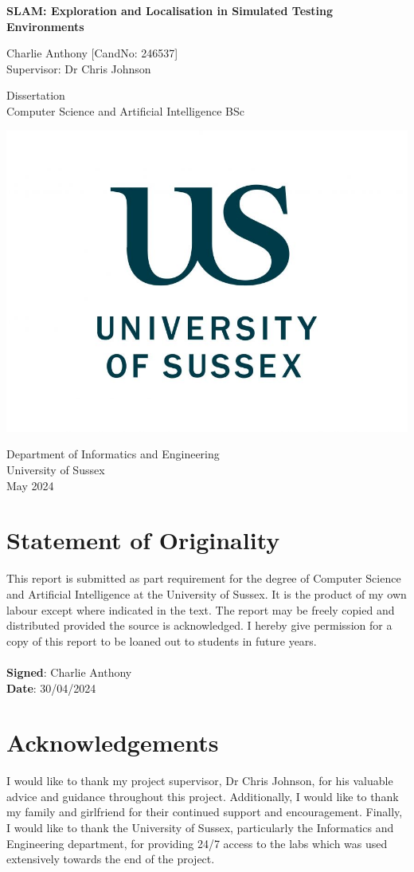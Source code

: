 \documentclass[12pt]{article}
\begin{document}
\begin{titlepage}
    \centering
    \vspace*{5cm}

    \Large
    \textbf{SLAM: Exploration and Localisation in Simulated Testing Environments}

    \vspace{1cm}

    Charlie Anthony [CandNo: 246537]\\
    Supervisor: Dr Chris Johnson

    \vfill

    \vspace{1cm}

    \small
    Dissertation\\
    Computer Science and Artificial Intelligence BSc

    \includegraphics[width=0.3\linewidth]{sussex_logo.jpg}

    \small
    Department of Informatics and Engineering\\
    University of Sussex\\
    May 2024
\end{titlepage}

\section*{Statement of Originality}
This report is submitted as part requirement for the degree of Computer Science and Artificial Intelligence at
the University of Sussex. It is the product of my own labour except where indicated in the text. The report may
be freely copied and distributed provided the source is acknowledged. I hereby give  permission for a copy of
this report to be loaned out to students in future years.\\ \\
\textbf{Signed}: Charlie Anthony \\
\textbf{Date}: 30/04/2024\\


\section*{Acknowledgements}
I would like to thank my project supervisor, Dr Chris Johnson, for his valuable advice and guidance throughout this project.
Additionally, I would like to thank my family and girlfriend for their continued support and encouragement. Finally,
I would like to thank the University of Sussex, particularly the Informatics and Engineering department, for providing
24/7 access to the labs which was used extensively towards the end of the project.
\end{document}
